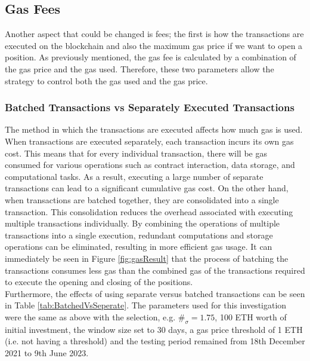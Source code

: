 \subsection{Gas Fees}
Another aspect that could be changed is fees; the first is how the transactions are executed on the blockchain and also the maximum gas price if we want to open a position. As previously mentioned, the gas fee is calculated by a combination of the gas price and the gas used. Therefore, these two parameters allow the strategy to control both the gas used and the gas price.

\subsubsection{Batched Transactions vs Separately Executed Transactions}
The method in which the transactions are executed affects how much gas is used. When transactions are executed separately, each transaction incurs its own gas cost. This means that for every individual transaction, there will be gas consumed for various operations such as contract interaction, data storage, and computational tasks. As a result, executing a large number of separate transactions can lead to a significant cumulative gas cost. On the other hand, when transactions are batched together, they are consolidated into a single transaction. This consolidation reduces the overhead associated with executing multiple transactions individually. By combining the operations of multiple transactions into a single execution, redundant computations and storage operations can be eliminated, resulting in more efficient gas usage. It can immediately be seen in Figure \ref{fig:gasResult} that the process of batching the transactions consumes less gas than the combined gas of the transactions required to execute the opening and closing of the positions.
\\[3mm]
Furthermore, the effects of using separate versus batched transactions can be seen in Table \ref{tab:BatchedVsSeperate}. The parameters used for this investigation were the same as above with the selection, e.g. $\#_{\sigma} = 1.75$, 100 ETH worth of initial investment, the window size set to 30 days, a gas price threshold of 1 ETH (i.e. not having a threshold) and the testing period remained from 18th December 2021 to 9th June 2023.

